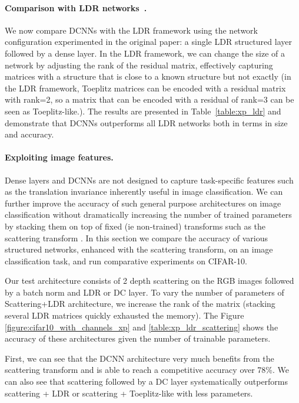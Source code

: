 \paragraph{Comparison with LDR networks~\cite{Thomas_NIPS2018_8119}.}
We now compare DCNNs with the LDR framework using the network configuration experimented in the original paper: a single LDR structured layer followed by a dense layer.
In the LDR framework, we can change the size of a network by adjusting the rank of the residual matrix, effectively capturing matrices with a structure that is close to a known structure but not exactly (in the LDR framework, Toeplitz matrices can be encoded with a residual matrix with rank=2, so a matrix that can be encoded with a residual of rank=3 can be seen as Toeplitz-like.).
The results are presented in Table~\ref{table:xp_ldr} and demonstrate that DCNNs outperforms all LDR networks both in terms in size and accuracy.

\paragraph{Exploiting image features.}
Dense layers and DCNNs are not designed to capture task-specific features such as the translation invariance inherently useful in image classification.
We can further improve the accuracy of such general purpose architectures on image classification without dramatically increasing the number of trained parameters by stacking them on top of fixed (ie non-trained) transforms such as the scattering transform \cite{mallat2010recursive}.
In this section we compare the accuracy of various structured networks, enhanced with the scattering transform, on an image classification task, and run comparative experiments on CIFAR-10. 

Our test architecture consists of 2 depth scattering on the RGB images followed by a batch norm and LDR or DC layer.
To vary the number of parameters of Scattering+LDR architecture, we increase the rank of the matrix (stacking several LDR matrices quickly exhausted the memory).
The Figure \ref{figure:cifar10_with_channels_xp} and \ref{table:xp_ldr_scattering} shows the accuracy of these architectures given the number of trainable parameters.

First, we can see that the DCNN architecture very much benefits from the scattering transform and is able to reach a competitive accuracy over 78\%.
We can also see that scattering followed by a DC layer systematically outperforms scattering + LDR or scattering + Toeplitz-like with less parameters. 


